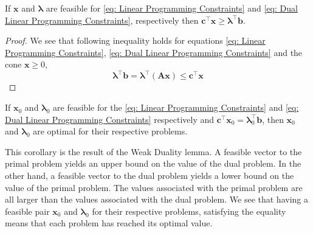 \begin{lemma}
If $\mathbf{x}$ and $\pmb{\lambda}$ are feasible for \eqref{eq: Linear Programming Constraints} and \eqref{eq: Dual Linear Programming Constraints}, respectively then $\mathbf{c}^\top\mathbf{x}\geq \pmb{\lambda}^\top\mathbf{b}$.
\end{lemma}

\begin{proof}
	We see that following inequality holds for equations \eqref{eq: Linear Programming Constraints}, \eqref{eq: Dual Linear Programming Constraints} and the cone $\mathbf{x}\geq 0$,
	\begin{equation*}
			\pmb{\lambda}^\top \mathbf{b}=\pmb{\lambda}^\top\left(\mathbf{Ax}\right)\leq \mathbf{c}^\top\mathbf{x}
	\end{equation*}
\end{proof}

\begin{corollary}
	\label{cor: Dual Primal equality}
	If $\mathbf{x}_0$ and $\pmb{\lambda}_0$ are feasible for the \eqref{eq: Linear Programming Constraints} and \eqref{eq: Dual Linear Programming Constraints} respectively and  $\mathbf{c}^\top \mathbf{x}_0=\pmb{\lambda}_0^\top\mathbf{b}$, then $\mathbf{x}_0$ and $\pmb{\lambda}_0$ are optimal for their respective problems.
\end{corollary}

This corollary is the result of the Weak Duality lemma. A feasible vector to the primal problem yields an upper bound on the value of the dual problem. In the other hand, a feasible vector to the dual problem yields a lower bound on the value of the primal problem. The values associated with the primal problem are all larger than the values associated with the dual problem. We see that having a feasible pair $\mathbf{x}_0$ and $\pmb{\lambda}_0$ for their respective problems, satisfying the equality means that each problem has reached its optimal value. 

